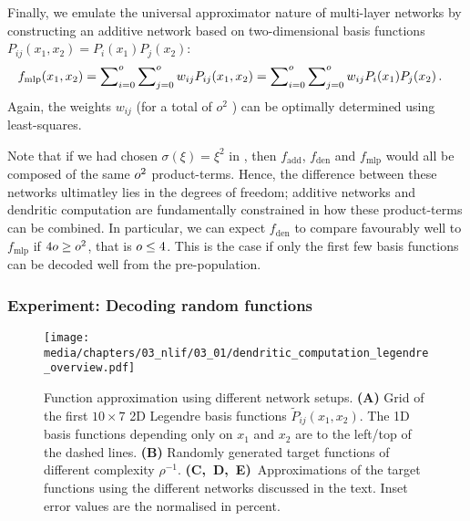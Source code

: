 Finally, we emulate the universal approximator nature of multi-layer networks by constructing an additive network based on two-dimensional basis functions $P_{ij}(x_1, x_2) = P_{i}(x_1) P_j(x_2)$:
\begin{align}
	f_\mathrm{mlp}(x_1, x_2)
		&= \sum\nolimits_{i = 0}^{o} \sum\nolimits_{j = 0}^{o} w_{ij} P_{ij}(x_1, x_2) = \sum\nolimits_{i = 0}^{o} \sum\nolimits_{j = 0}^{o} w_{ij} P_{i}(x_1) P_j(x_2) \,.
	\label{eqn:f_mlp}
\end{align}
Again, the weights $w_{ij}$ (for a total of $o^2$ \DOF) can be optimally determined using least-squares.

Note that if we had chosen $\sigma(\xi) = \xi^2$ in , then $f_\mathrm{add}$, $f_\mathrm{den}$ and $f_\mathrm{mlp}$ would all be composed of the same $o^2$ product-terms.
Hence, the difference between these networks ultimatley lies in the degrees of freedom; additive networks and dendritic computation are fundamentally constrained in how these product-terms can be combined.
In particular, we can expect $f_\mathrm{den}$ to compare favourably well to $f_\mathrm{mlp}$ if $4o \geq o^2$, that is $o \leq 4$.
This is the case if only the first few basis functions can be decoded well from the pre-population.

\subsubsection{Experiment: Decoding random functions}

\begin{figure}
	\texttt{[image: media/chapters/03\_nlif/03\_01/dendritic\_computation\_legendre\_overview.pdf]}%
	{\label{fig:dendritic_computation_legendre_overview_a}}%
	{\label{fig:dendritic_computation_legendre_overview_b}}%
	{\label{fig:dendritic_computation_legendre_overview_c}}%
	{\label{fig:dendritic_computation_legendre_overview_d}}%
	{\label{fig:dendritic_computation_legendre_overview_e}}%
	\caption[Function approximation using different network setups]{Function approximation using different network setups.
	\textbf{(A)} Grid of the first $10 \times 7$ 2D Legendre basis functions $\tilde P_{ij}(x_1, x_2)$. The 1D basis functions depending only on $x_1$ and $x_2$ are to the left/top of the dashed lines.
	\textbf{(B)} Randomly generated target functions of different complexity $\rho^{-1}$.
	\textbf{(C,~D,~E)}~Approximations of the target functions using the different networks discussed in the text. Inset error values are the normalised \RMSE in percent.
	}
	\label{fig:dendritic_computation_legendre_overview}
\end{figure}


